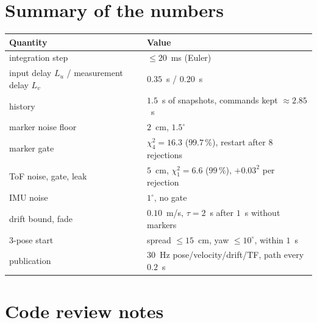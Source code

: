 \section{Summary of the numbers}

\begin{center}
\begin{tabular}{@{}ll@{}}
\toprule
Quantity & Value \\
\midrule
integration step & $\le 20$~ms (Euler) \\
input delay $L_u$ / measurement delay $L_v$ & $0.35$~s / $0.20$~s \\
history & $1.5$~s of snapshots, commands kept $\approx 2.85$~s \\
marker noise floor & $2$~cm, $1.5^\circ$ \\
marker gate & $\chi^2_4 = 16.3$ ($99.7\,\%$), restart after 8 rejections \\
ToF noise, gate, leak & $5$~cm, $\chi^2_1=6.6$ ($99\,\%$), $+0.03^2$ per rejection \\
IMU noise & $1^\circ$, no gate \\
drift bound, fade & $0.10$~m/s, $\tau=2$~s after $1$~s without markers \\
3-pose start & spread $\le15$~cm, yaw $\le10^\circ$, within $1$~s \\
publication & $30$~Hz pose/velocity/drift/TF, path every $0.2$~s \\
\bottomrule
\end{tabular}
\end{center}

\section{Code review notes}

